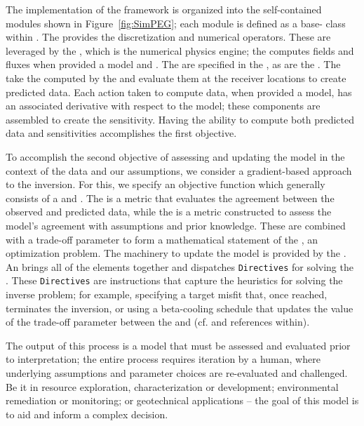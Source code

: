 The implementation of the framework is organized into the self-contained
modules shown in Figure~\ref{fig:SimPEG}; each module is defined as a base-
class within \SimPEG. The \Mesh provides the discretization and numerical
operators. These are leveraged by the \Problem, which is the numerical physics
engine; the \Problem computes fields and fluxes when provided a model and \Sources. The
\Sources are specified in the \Survey, as are the \Receivers. The \Receivers
take the \Fields computed by the \Problem and evaluate them at the receiver
locations to create predicted data. Each action taken to compute data, when
provided a model, has an associated derivative with respect to the model;
these components are assembled to create the sensitivity. Having the ability
to compute both predicted data and sensitivities accomplishes the first
objective.

To accomplish the second objective of assessing and updating the model in the context of the
data and our assumptions, we consider a gradient-based approach to the
inversion. For this, we specify an objective function which generally consists of a
\DataMisfit and \Regularization. The \DataMisfit is a metric that evaluates
the agreement between the observed and predicted data, while the
\Regularization is a metric constructed to assess the model's agreement with
assumptions and prior knowledge. These are combined with a trade-off parameter
to form a mathematical statement of the \InvProblem, an optimization problem.
The machinery to update the model is provided by the \Optimization. An
\Inversion brings all of the elements together and dispatches \texttt{Directives}
for solving the \InvProblem. These \texttt{Directives} are
instructions that capture the heuristics for solving the inverse problem; for
example, specifying a target misfit that, once reached, terminates the
inversion, or using a beta-cooling schedule that updates the value of the
trade-off parameter between the \DataMisfit and \Regularization (cf.
\cite{parker1994geophysical, OldenburgTutorial} and references within).

The output of this process is a model that must be assessed and evaluated
prior to interpretation; the entire process requires iteration by a human,
where underlying assumptions and parameter choices are re-evaluated and
challenged. Be it in resource exploration, characterization or development;
environmental remediation or monitoring; or geotechnical applications -- the
goal of this model is to aid and inform a complex decision.

